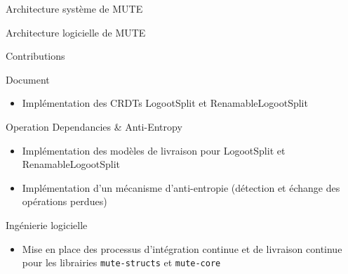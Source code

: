 \begin{frame}{Architecture système de MUTE}
    \vspace{-0.5cm}
    \begin{figure}
    \end{figure}
\end{frame}


\begin{frame}{Architecture logicielle de MUTE}
    \vspace{-0.5cm}
    \begin{figure}
    \end{figure}
\end{frame}

\begin{frame}{Contributions}
    \begin{block}{Document}
        \begin{itemize}
            \item Implémentation des CRDTs LogootSplit et RenamableLogootSplit
        \end{itemize}
    \end{block}

    \begin{block}{Operation Dependancies \& Anti-Entropy}
        \begin{itemize}
            \item Implémentation des modèles de livraison pour LogootSplit et RenamableLogootSplit
            \item Implémentation d'un mécanisme d'anti-entropie (détection et échange des opérations perdues)
        \end{itemize}
    \end{block}

    \begin{block}{Ingénierie logicielle}
        \begin{itemize}
            \item Mise en place des processus d'intégration continue et de livraison continue pour les librairies \texttt{mute-structs} et \texttt{mute-core}
        \end{itemize}
    \end{block}
\end{frame}


